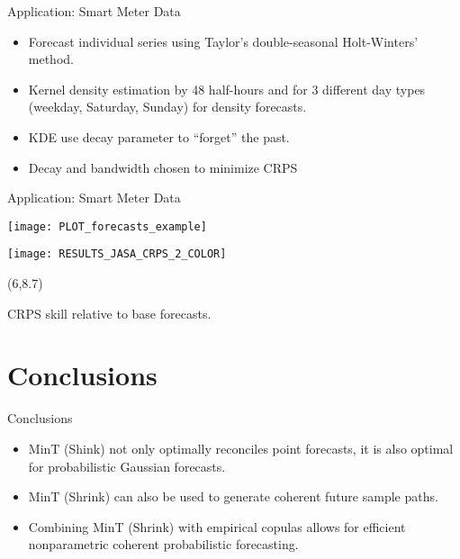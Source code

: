 \documentclass[14pt]{beamer}
\begin{document}
\begin{frame}{Application: Smart Meter Data}

\begin{itemize}
  \item Forecast individual series using Taylor's double-seasonal Holt-Winters' method.
  \item Kernel density estimation by 48 half-hours and for 3 different day types (weekday, Saturday, Sunday) for density forecasts.
  \item KDE use decay parameter to ``forget'' the past.
  \item Decay and bandwidth chosen to minimize CRPS
\end{itemize}
\end{frame}

\begin{frame}{Application: Smart Meter Data}
\centerline{\texttt{[image: PLOT\_forecasts\_example]}}
\centerline{\texttt{[image: RESULTS\_JASA\_CRPS\_2\_COLOR]}}
\begin{textblock}{6.6}(6,8.7)
\begin{block}{}\small CRPS skill relative to base forecasts.\end{block}
\end{textblock}
\end{frame}

\section{Conclusions}

\begin{frame}{Conclusions}

\begin{itemize}
  \item MinT (Shink) not only optimally reconciles point forecasts, it is also optimal for probabilistic Gaussian forecasts.
  \item MinT (Shrink) can also be used to generate coherent future sample paths.
  \item Combining MinT (Shrink) with empirical copulas allows for efficient nonparametric coherent probabilistic forecasting.
\end{itemize}

\end{frame}
\end{document}
